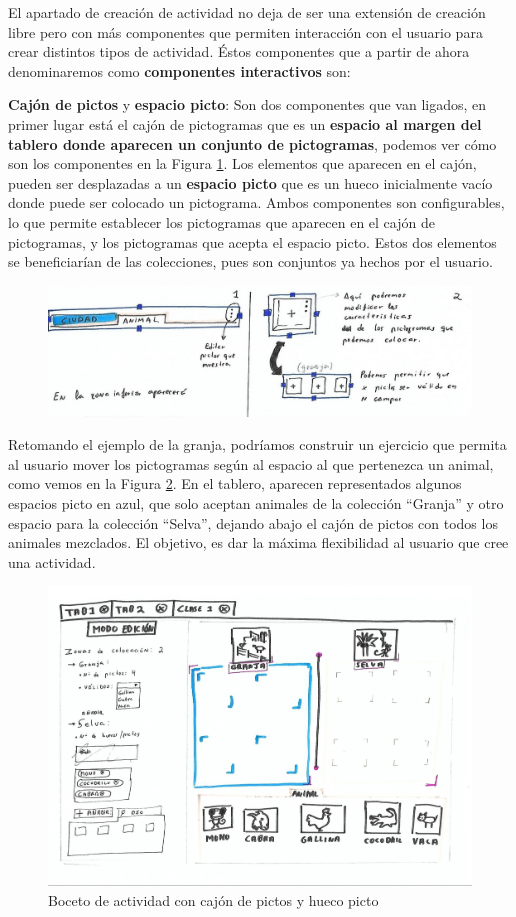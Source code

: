 El apartado de  creación de actividad no deja de ser una extensión de creación libre pero con más  componentes que permiten interacción con el usuario para crear distintos tipos de actividad. Éstos componentes que a partir de ahora denominaremos como \textbf{componentes interactivos} son:


\textbf{Cajón de pictos} y \textbf{espacio picto}: Son dos componentes que van ligados, en primer lugar está el cajón de pictogramas que es un \textbf{espacio al margen del tablero donde aparecen un conjunto de pictogramas}, podemos ver cómo son los componentes en la Figura \ref{fig:componentecajon}. Los elementos que aparecen en el cajón, pueden  ser desplazadas a un \textbf{espacio picto} que es un hueco inicialmente vacío donde puede ser colocado un pictograma. Ambos componentes son configurables, lo que permite establecer los pictogramas que aparecen en el cajón de pictogramas, y los pictogramas que acepta el espacio picto. Estos dos elementos se beneficiarían de las colecciones, pues son conjuntos ya hechos por el usuario.

\begin{figure}[h!]
	\centering
	\includegraphics[width=0.7\linewidth]{Imagenes/Bitmap/componenteCajon}
	\caption{}
	\label{fig:componentecajon}
\end{figure}




Retomando el ejemplo de la granja, podríamos construir un ejercicio que permita al usuario mover los pictogramas según al espacio al que pertenezca un animal, como vemos en la Figura \ref{fig:cajonpictosgranja}. En el tablero, aparecen representados algunos espacios picto en azul, que solo aceptan animales de la colección “Granja” y otro espacio para la colección “Selva”, dejando abajo el cajón de pictos con todos los animales mezclados. El objetivo, es dar la máxima flexibilidad al usuario que cree una actividad.

\begin{figure}[h!]
	\centering
	\includegraphics[width=0.7\linewidth]{Imagenes/Bitmap/cajonPictosGranja}
	\caption{Boceto de actividad con cajón de pictos y hueco picto}
	\label{fig:cajonpictosgranja}
\end{figure}

